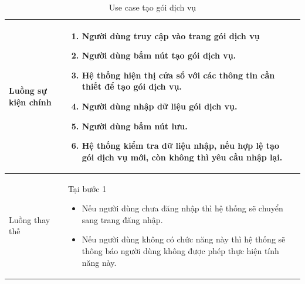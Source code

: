 \documentclass[12pt,a4paper]{article}
\begin{document}
\begin{table}[H]
\begin{tabular}{|p{3.5cm}|p{11.5cm}|c|}
            Luồng sự kiện chính & \vspace{-.8cm}\begin{enumerate}
                                                    \item Người dùng truy cập vào trang gói dịch vụ
                                                    \item  Người dùng bấm nút tạo gói dịch vụ.
                                                    \item  Hệ thống hiện thị cửa sổ với các thông tin cần thiết để tạo gói dịch vụ.
                                                    \item  Người dùng nhập dữ liệu gói dịch vụ.
                                                    \item Người dùng bấm nút lưu.
                                                    \item Hệ thống kiểm tra dữ liệu nhập, nếu hợp lệ tạo gói dịch vụ mới, còn không thì yêu cầu nhập lại.
            \end{enumerate}
            \\
            \hline
            Luồng thay thế & Tại bước 1\newline
            \vspace{-.8cm}\begin{itemize}
                              \item Nếu người dùng chưa đăng nhập thì hệ thống sẽ chuyển sang trang đăng nhập.
                              \item  Nếu người dùng không có chức năng này thì hệ thống sẽ thông báo người dùng không được phép thực hiện tính năng này.
            \end{itemize}
            \\
            \hline
        \end{tabular}
        \caption{Use case tạo gói dịch vụ}
    \end{table}


\end{document}
